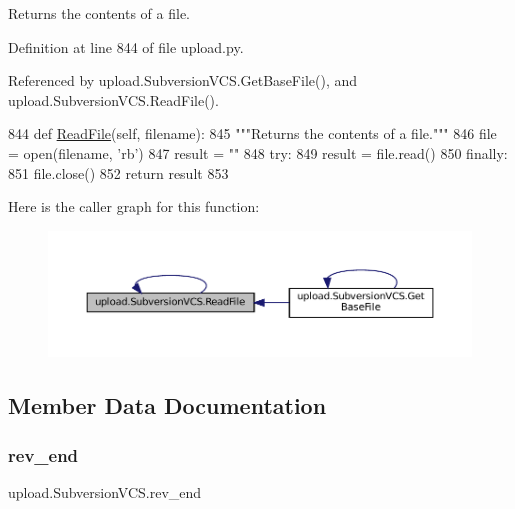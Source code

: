 \begin{DoxyVerb}Returns the contents of a file.\end{DoxyVerb}
 

Definition at line 844 of file upload.\+py.



Referenced by upload.\+Subversion\+V\+C\+S.\+Get\+Base\+File(), and upload.\+Subversion\+V\+C\+S.\+Read\+File().


\begin{DoxyCode}
844   \textcolor{keyword}{def }\hyperlink{namespacecpp_1_1utils_a4258aa53673d101d6f57320ec9a3c3a2}{ReadFile}(self, filename):
845     \textcolor{stringliteral}{"""Returns the contents of a file."""}
846     file = open(filename, \textcolor{stringliteral}{'rb'})
847     result = \textcolor{stringliteral}{""}
848     \textcolor{keywordflow}{try}:
849       result = file.read()
850     \textcolor{keywordflow}{finally}:
851       file.close()
852     \textcolor{keywordflow}{return} result
853 
\end{DoxyCode}
Here is the caller graph for this function\+:
\nopagebreak
\begin{figure}[H]
\begin{center}
\leavevmode
\includegraphics[width=350pt]{classupload_1_1SubversionVCS_a340d269b74386ac863636f6b0683d9f4_icgraph}
\end{center}
\end{figure}


\subsection{Member Data Documentation}
\mbox{\label{classupload_1_1SubversionVCS_ac0bb07a099c722b7f8622de4b225904f}} 
\subsubsection{\texorpdfstring{rev\+\_\+end}{rev\_end}}
{\footnotesize\ttfamily upload.\+Subversion\+V\+C\+S.\+rev\+\_\+end}



